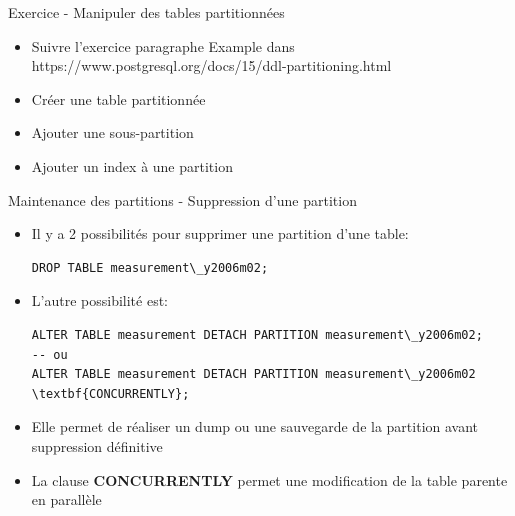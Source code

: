 
\begin{frame}[fragile]{Exercice - Manipuler des tables partitionnées}

   \begin{itemize}
      \item Suivre l'exercice paragraphe Example dans https://www.postgresql.org/docs/15/ddl-partitioning.html
      \item Créer une table partitionnée
      \item Ajouter une sous-partition
      \item Ajouter un index à une partition
   \end{itemize}

\end{frame}


\begin{frame}[fragile]{Maintenance des partitions - Suppression d'une partition}

   \begin{itemize}
      \item Il y a 2 possibilités pour supprimer une partition d'une table:
\begin{tiny}
\begin{Verbatim}[commandchars=\\\{\}]
   DROP TABLE measurement\_y2006m02;
\end{Verbatim}
\end{tiny}
      \item L'autre possibilité est:
\begin{tiny}
\begin{Verbatim}[commandchars=\\\{\}]
ALTER TABLE measurement DETACH PARTITION measurement\_y2006m02;
-- ou
ALTER TABLE measurement DETACH PARTITION measurement\_y2006m02 \textbf{CONCURRENTLY};
\end{Verbatim}
\end{tiny}
      \item Elle permet de réaliser un dump ou une sauvegarde de la partition avant suppression définitive
      \item La clause \textbf{CONCURRENTLY} permet une modification de la table parente en parallèle
   \end{itemize}

\end{frame}

